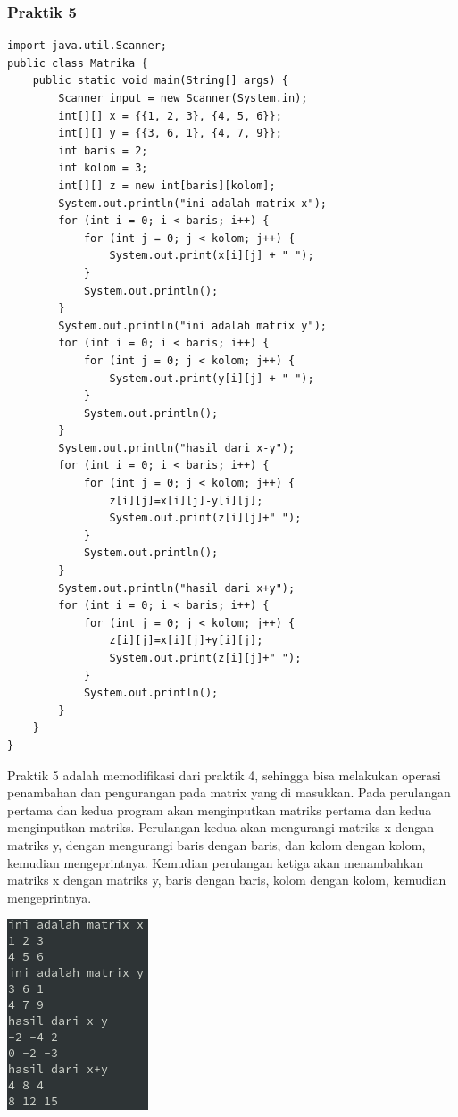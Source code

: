 \documentclass[a4paper,12pt]{article}
\begin{document}
\subsubsection{Praktik 5}
\begin{lstlisting}
import java.util.Scanner;
public class Matrika {
    public static void main(String[] args) {
        Scanner input = new Scanner(System.in);
        int[][] x = {{1, 2, 3}, {4, 5, 6}};
        int[][] y = {{3, 6, 1}, {4, 7, 9}};
        int baris = 2;
        int kolom = 3;
        int[][] z = new int[baris][kolom];
        System.out.println("ini adalah matrix x");
        for (int i = 0; i < baris; i++) {
            for (int j = 0; j < kolom; j++) {
                System.out.print(x[i][j] + " ");
            }
            System.out.println();
        }
        System.out.println("ini adalah matrix y");
        for (int i = 0; i < baris; i++) {
            for (int j = 0; j < kolom; j++) {
                System.out.print(y[i][j] + " ");
            }
            System.out.println();
        }
        System.out.println("hasil dari x-y");
        for (int i = 0; i < baris; i++) {
            for (int j = 0; j < kolom; j++) {
                z[i][j]=x[i][j]-y[i][j];
                System.out.print(z[i][j]+" ");
            }
            System.out.println();
        }
        System.out.println("hasil dari x+y");
        for (int i = 0; i < baris; i++) {
            for (int j = 0; j < kolom; j++) {
                z[i][j]=x[i][j]+y[i][j];
                System.out.print(z[i][j]+" ");
            }
            System.out.println();
        }
    }
}
\end{lstlisting}
Praktik 5 adalah memodifikasi dari praktik 4, sehingga bisa melakukan operasi penambahan dan pengurangan pada matrix yang di masukkan. Pada perulangan 
pertama dan kedua program akan menginputkan matriks pertama dan kedua menginputkan matriks. Perulangan kedua akan mengurangi matriks x dengan matriks y, 
dengan mengurangi baris dengan baris, dan kolom dengan kolom, kemudian mengeprintnya. Kemudian perulangan ketiga akan menambahkan matriks x dengan matriks y, baris dengan baris, kolom dengan kolom, kemudian mengeprintnya.
\begin{center}
    \includegraphics{5.png}
\end{center}
\end{document}
